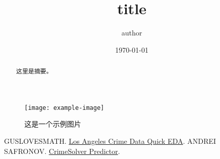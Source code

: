 \documentclass{article}
\begin{document}
\sloppy %

\title{title}
\author{author}
\date{\today}

\maketitle

\renewcommand{\abstractname}{摘要}  %

\begin{abstract}
    这里是摘要。
\end{abstract}

\begin{figure}[h]
    \centering
    \texttt{[image: example-image]}
    \caption{这是一个示例图片}
    \label{fig:example}
\end{figure}

\begin{thebibliography}{99}
     GUSLOVESMATH. \href{https://www.kaggle.com/code/guslovesmath/los-angeles-crime-data-quick-eda}{Los Angeles Crime Data Quick EDA}.
     ANDREI SAFRONOV. \href{https://www.kaggle.com/code/safronov00/crimesolver-predictor#2.-Clean-Data}{CrimeSolver Predictor}.
\end{thebibliography}
\end{document}
